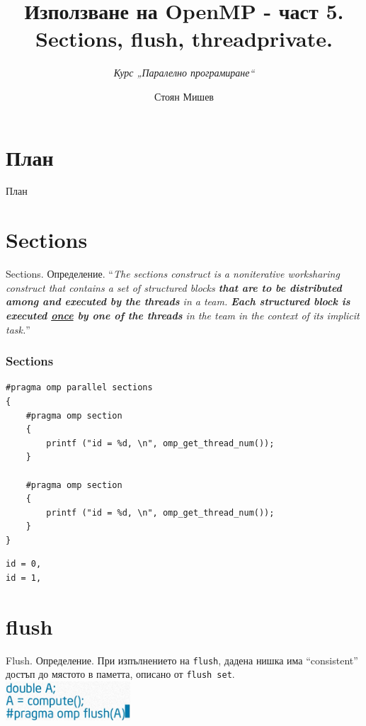 \documentclass{beamer}
\title{Използване на OpenMP - част 5. Sections, flush, threadprivate.}
\subtitle{\textit{Курс „Паралелно програмиране“}}
\author{\newline \newline Стоян Мишев}
\date{} %
\begin{document}
\lstset{language=Python}
{ 
\frame{\titlepage}}


\section*{План}\begin{frame}{План}\tableofcontents\end{frame}

\section{Sections}
\begin{frame}{Sections. Определение.}
  ``\textit{The sections construct is a noniterative worksharing construct that
  contains a set of structured blocks \textbf{that are to be distributed among
  and executed by the threads} in a team. \textbf{Each structured block is
  executed \underline{once} by one of the threads} in the team in the context of
  its implicit task.}''
\end{frame}

\begin{frame}
  \frametitle{Sections}

    \begin{lstlisting}
#pragma omp parallel sections
{
    #pragma omp section
    { 
        printf ("id = %d, \n", omp_get_thread_num());
    }

    #pragma omp section
    { 
        printf ("id = %d, \n", omp_get_thread_num());
    }
}
    \end{lstlisting}
  
\begin{verbatim}
id = 0,
id = 1,
\end{verbatim}

\end{frame}



\section{flush}
\begin{frame}[fragile]{Flush. Определение.}
  При изпълнението на \verb+flush+, дадена нишка има ``consistent'' достъп до мястото в паметта, описано от \verb+flush set+. \pause
  \centering
  \includegraphics[width=0.35\textwidth]{flush}
\end{frame}
\end{document}
